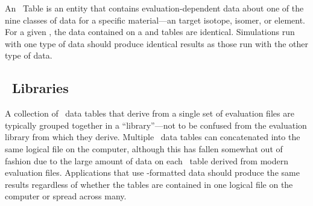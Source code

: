 An \ACE\ Table is an entity that contains evaluation-dependent data about one of the nine classes of data for a specific material---an target isotope, isomer, or element. For a given \ZAID, the data contained on a  and  tables are identical. Simulations run with one type of data should produce identical results as those run with the other type of data. 

\subsection{\ACE\ Libraries}
A collection of \ACE\ data tables that derive from a single set of evaluation files are typically grouped together in a ``library''---not to be confused from the evaluation library from which they derive. Multiple \ACE\ data tables can concatenated into the same logical file on the computer, although this has fallen somewhat out of fashion due to the large amount of data on each \ACE\ table derived from modern evaluation files. Applications that use \ACE-formatted data should produce the same results regardless of whether the tables are contained in one logical file on the computer or spread across many.
